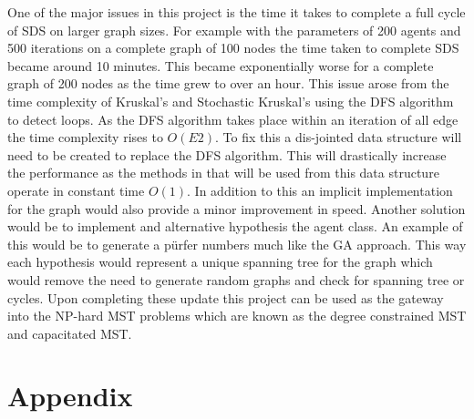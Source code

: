 \documentclass{AISB2008}
\begin{document}
One of the major issues in this project is the time it takes to complete a full cycle of SDS on larger graph sizes. For example with the parameters of 200 agents and 500 iterations on a complete graph of 100 nodes the time taken to complete SDS became around 10 minutes. This became exponentially worse for a complete graph of 200 nodes as the time grew to over an hour.
This issue arose from the time complexity of Kruskal’s and Stochastic Kruskal’s using the DFS algorithm to detect loops. As the DFS algorithm takes place within an iteration of all edge the time complexity rises to {$O (E2)$}. To fix this a dis-jointed data structure will need to be created to replace the DFS algorithm. This will drastically increase the performance as the methods in that will be used from this data structure operate in constant time {$O (1)$}. In addition to this an implicit implementation for the graph would also provide a minor improvement in speed.
Another solution would be to implement and alternative hypothesis the agent class. An example of this would be to generate a pürfer numbers much like the GA approach. This way each hypothesis would represent a unique spanning tree for the graph which would remove the need to generate random graphs and check for spanning tree or cycles.
Upon completing these update this project can be used as the gateway into the NP-hard MST problems which are known as the degree constrained MST and capacitated MST.




\section{Appendix}
\end{document}

